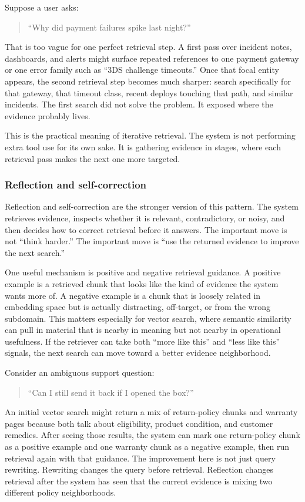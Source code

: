 \documentclass[12pt]{article}
\begin{document}
Suppose a user asks:
\begin{quote}
``Why did payment failures spike last night?''
\end{quote}
That is too vague for one perfect retrieval step. A first pass over
incident notes, dashboards, and alerts might surface repeated references
to one payment gateway or one error family such as ``3DS challenge
timeouts.'' Once that focal entity appears, the second retrieval step
becomes much sharper: search specifically for that gateway, that timeout
class, recent deploys touching that path, and similar incidents. The first
search did not solve the problem. It exposed where the evidence probably
lives.

This is the practical meaning of iterative retrieval. The system is not
performing extra tool use for its own sake. It is gathering evidence in
stages, where each retrieval pass makes the next one more targeted.

\subsubsection{Reflection and self-correction}

Reflection and self-correction are the stronger version of this pattern.
The system retrieves evidence, inspects whether it is relevant,
contradictory, or noisy, and then decides how to correct retrieval before
it answers. The important move is not ``think harder.'' The important move
is ``use the returned evidence to improve the next search.''

One useful mechanism is positive and negative retrieval guidance. A
positive example is a retrieved chunk that looks like the kind of evidence
the system wants more of. A negative example is a chunk that is loosely
related in embedding space but is actually distracting, off-target, or
from the wrong subdomain. This matters especially for vector search, where
semantic similarity can pull in material that is nearby in meaning but not
nearby in operational usefulness. If the retriever can take both ``more
like this'' and ``less like this'' signals, the next search can move
toward a better evidence neighborhood.

Consider an ambiguous support question:
\begin{quote}
``Can I still send it back if I opened the box?''
\end{quote}
An initial vector search might return a mix of return-policy chunks and
warranty pages because both talk about eligibility, product condition, and
customer remedies. After seeing those results, the system can mark one
return-policy chunk as a positive example and one warranty chunk as a
negative example, then run retrieval again with that guidance. The
improvement here is not just query rewriting. Rewriting changes the query
before retrieval. Reflection changes retrieval after the system has seen
that the current evidence is mixing two different policy neighborhoods.
\end{document}

